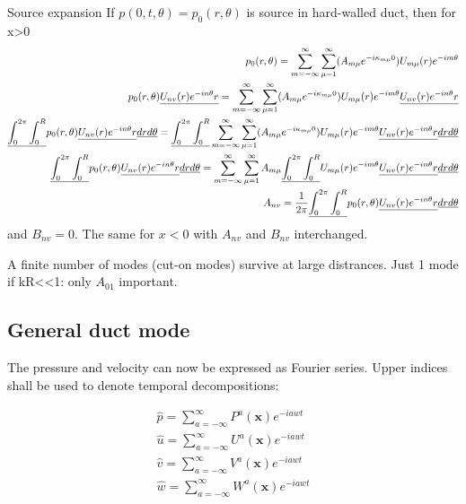 \documentclass{Note}
\begin{document}
Source expansion
If $p(0,t,\theta)=p_0(r,\theta)$ is source in hard-walled duct, then for x>0
\begin{equation}
\begin{aligned}
p_0(r,\theta)=\sum_{m=-\infty}^\infty \sum_{\mu=1}^\infty (A_{m\mu}e^{-i\kappa_{m\mu}0})U_{m\mu}(r)e^{-im\theta}\\
p_0(r,\theta)\underline{U_{nv}(r)e^{-in\theta}r}=\sum_{m=-\infty}^\infty \sum_{\mu=1}^\infty (A_{m\mu}e^{-i\kappa_{m\mu}0})U_{m\mu}(r)e^{-im\theta}\underline{U_{nv}(r)e^{-in\theta}r}\\
\underline{\int_0^{2\pi}\int_0^R} p_0(r,\theta)\underline{U_{nv}(r)e^{-in\theta}r}\underline{drd\theta}=\underline{\int_0^{2\pi}\int_0^R}\sum_{m=-\infty}^\infty \sum_{\mu=1}^\infty (A_{m\mu}e^{-i\kappa_{m\mu}0})U_{m\mu}(r)e^{-im\theta}\underline{U_{nv}(r)e^{-in\theta}r}\underline{drd\theta}\\
\underline{\int_0^{2\pi}\int_0^R} p_0(r,\theta)\underline{U_{nv}(r)e^{-in\theta}r}\underline{drd\theta}=\sum_{m=-\infty}^\infty \sum_{\mu=1}^\infty A_{m\mu}\underline{\int_0^{2\pi}\int_0^R}U_{m\mu}(r)e^{-im\theta}\underline{U_{nv}(r)e^{-in\theta}r}\underline{drd\theta}\\
A_{nv}={1\over 2\pi}\underline{\int_0^{2\pi}\int_0^R} p_0(r,\theta)\underline{U_{nv}(r)e^{-in\theta}r}\underline{drd\theta}
\end{aligned}
\end{equation}
and $B_{nv}=0$. The same for $x<0$ with $A_{nv}$ and $B_{nv}$ interchanged.

A finite number of modes (cut-on modes) survive at large distrances.
Just 1 mode if kR<<1: only $A_{01}$ important.


\subsection{General duct mode}
The pressure and velocity can now be expressed as Fourier series. Upper indices shall be used to denote temporal decompositions:

\begin{equation}
\begin{aligned}
\widehat{p}=\sum_{a=-\infty}^{\infty}P^a(\textbf{x})e^{-iawt}\\
\widehat{u}=\sum_{a=-\infty}^{\infty}U^a(\textbf{x})e^{-iawt}\\
\widehat{v}=\sum_{a=-\infty}^{\infty}V^a(\textbf{x})e^{-iawt}\\
\widehat{w}=\sum_{a=-\infty}^{\infty}W^a(\textbf{x})e^{-iawt}\\
\end{aligned}
\end{equation}
\end{document}
